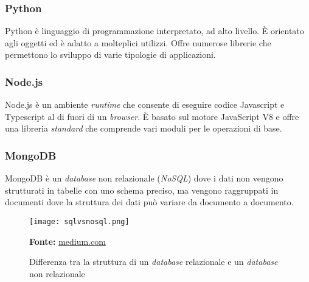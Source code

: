 \subsubsection{Python}
Python è linguaggio di programmazione interpretato, ad alto livello. È orientato agli oggetti ed è adatto a molteplici utilizzi. Offre numerose librerie che permettono lo sviluppo di varie tipologie di applicazioni. 
\subsubsection{Node.js}
Node.js è un ambiente \textit{runtime} che consente di eseguire codice Javascript e Typescript al di fuori di un \textit{browser}. È basato sul motore JavaScript V8 e offre una libreria \textit{standard} che comprende vari moduli per le operazioni di base. 
\subsubsection{MongoDB}
MongoDB è un \textit{database} non relazionale (\textit{NoSQL}) dove i dati non vengono strutturati in tabelle con uno schema preciso, ma vengono raggruppati in documenti dove la struttura dei dati può variare da documento a documento.  
\begin{figure}[H]
    \centering
    \texttt{[image: sqlvsnosql.png]}
    \caption{Differenza tra la struttura di un \textit{database} relazionale e un \textit{database} non relazionale}
    \small \textbf{Fonte:} \href{https://naveen-metta.medium.com/decoding-the-database-dilemma-sql-vs-nosql-in-system-design-8666e21f4a58c}{medium.com}
    \label{fig:sql-vs-nosql}
\end{figure} 

